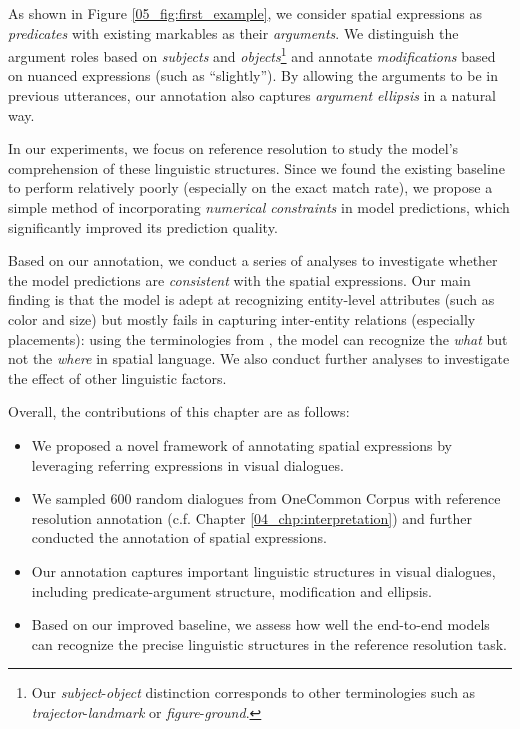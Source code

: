 As shown in Figure \ref{05_fig:first_example}, we consider spatial expressions as \textit{predicates} with existing markables as their \textit{arguments}. We distinguish the argument roles based on \textit{subjects} and \textit{objects}\footnote{Our \textit{subject}-\textit{object} distinction corresponds to other terminologies such as \textit{trajector}-\textit{landmark} or \textit{figure}-\textit{ground}.} and annotate \textit{modifications} based on nuanced expressions (such as ``slightly''). By allowing the arguments to be in previous utterances, our annotation also captures \textit{argument ellipsis} in a natural way.

In our experiments, we focus on reference resolution to study the model's comprehension of these linguistic structures. Since we found the existing baseline to perform relatively poorly (especially on the exact match rate), we propose a simple method of incorporating \textit{numerical constraints} in model predictions, which significantly improved its prediction quality.

Based on our annotation, we conduct a series of analyses to investigate whether the model predictions are \textit{consistent} with the spatial expressions. Our main finding is that the model is adept at recognizing entity-level attributes (such as color and size) but mostly fails in capturing inter-entity relations (especially placements): using the terminologies from \citet{landau1993and}, the model can recognize the \textit{what} but not the \textit{where} in spatial language. We also conduct further analyses to investigate the effect of other linguistic factors.

Overall, the contributions of this chapter are as follows:

\begin{itemize}
  \item We proposed a novel framework of annotating spatial expressions by leveraging referring expressions in visual dialogues.
  \item We sampled 600 random dialogues from OneCommon Corpus with reference resolution annotation (c.f. Chapter \ref{04_chp:interpretation}) and further conducted the annotation of spatial expressions.
  \item Our annotation captures important linguistic structures in visual dialogues, including predicate-argument structure, modification and ellipsis.
  \item Based on our improved baseline, we assess how well the end-to-end models can recognize the precise linguistic structures in the reference resolution task.
\end{itemize}


